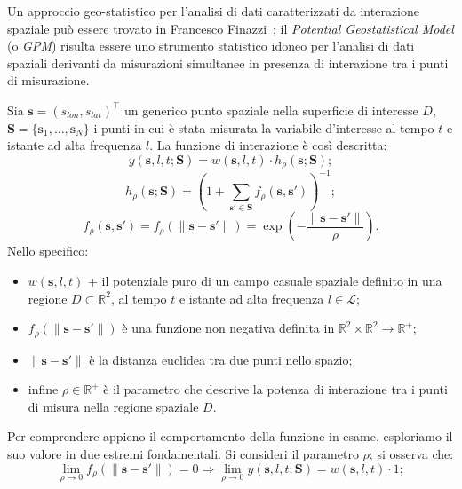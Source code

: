 \par Un approccio geo-statistico per l'analisi di dati caratterizzati da interazione spaziale può essere trovato in Francesco Finazzi~\cite{paper_GPM}; il \textit{Potential Geostatistical Model} (o \textit{GPM}) risulta essere uno strumento statistico idoneo per l'analisi di dati spaziali derivanti da misurazioni simultanee in presenza di interazione tra i punti di misurazione.
\par Sia $\mathbf{s} = (s_{lon}, s_{lat})^\top$ un generico punto spaziale nella superficie di interesse $D$, $\mathbf{S} = \{\mathbf{s}_1, \ldots, \mathbf{s}_ N\}$ i punti in cui è stata misurata la variabile d'interesse al tempo $t$ e istante ad alta frequenza $l$. La funzione di interazione è così descritta:
\begin{equation}
	y(\mathbf{s}, l, t; \mathbf{S}) = w(\mathbf{s}, l, t) \cdot h_\rho(\mathbf{s}; \mathbf{S});
	\label{funzione di interazione}
\end{equation}
\begin{equation}
	h_\rho(\mathbf{s};\mathbf{S}) = \left(1 + \sum_{\mathbf{s}' \in \mathbf{S}} f_\rho(\mathbf{s}, \mathbf{s}')\right)^{-1};
	\label{funzione di interazione_2}
\end{equation}
\begin{equation}
	f_\rho(\mathbf{s}, \mathbf{s}') = f_\rho(\|\mathbf{s} - \mathbf{s}'\|) = \exp\left(-\frac{{\|\mathbf{s} - \mathbf{s}'\|}}{{\rho}}\right).
	\label{nonnegative binary function}
\end{equation}
Nello specifico:
\begin{itemize}
	\item $w(\mathbf{s}, l, t)$ + il potenziale puro di un campo casuale spaziale definito in una regione  $D \subset \mathbb{R}^2$, al tempo $t$ e istante ad alta frequenza $l\in\mathcal{L}$;
	\item $f_\rho(\|\mathbf{s} - \mathbf{s}'\|)$ è una funzione non negativa definita in $ \mathbb{R}^2 \times \mathbb{R}^2 \rightarrow \mathbb{R}^+$;
	\item $\|\mathbf{s} - \mathbf{s}'\|$ è la distanza euclidea tra due punti nello spazio;
	\item infine $\rho \in \mathbb{R}^+$ è il parametro che descrive la potenza di interazione tra i punti di misura nella regione spaziale $D$.
\end{itemize}
Per comprendere appieno il comportamento della funzione in esame, esploriamo il suo valore in due estremi fondamentali. Si consideri il parametro $\rho$; si osserva che:
\begin{equation}
	\lim_{\rho \to 0} f_\rho(\|\mathbf{s} - \mathbf{s}'\|) = 0
		 \Rightarrow \lim_{\rho \to 0} y(\mathbf{s}, l, t; \mathbf{S}) = w(\mathbf{s}, l, t)\cdot 1; \label{limite_per_rho_tendente_a_0}
\end{equation}
